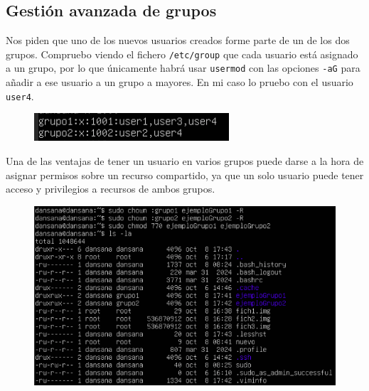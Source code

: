 \documentclass[10pt]{article}
\begin{document}
	\subsection{Gestión avanzada de grupos}
	Nos piden que uno de los nuevos usuarios creados forme parte de un de los dos grupos. Compruebo viendo el fichero \verb|/etc/group| que cada usuario está asignado a un grupo, por lo que únicamente habrá usar \verb|usermod| con las opciones \verb|-aG| para añadir a ese usuario a un grupo a mayores. En mi caso lo pruebo con el usuario \verb|user4|.
	\begin{figure}[H]
		\setlength{\abovecaptionskip}{0cm}
		\setlength{\belowcaptionskip}{0cm}
		\centering
		\includegraphics[width=0.6\linewidth]{Recursos/user2group.png}
	\end{figure}
	Una de las ventajas de tener un usuario en varios grupos puede darse a la hora de asignar permisos sobre un recurso compartido, ya que un solo usuario puede tener acceso y privilegios a recursos de ambos grupos.
	\begin{figure}[H]
		\setlength{\abovecaptionskip}{0cm}
		\setlength{\belowcaptionskip}{0cm}
		\centering
		\includegraphics[width=0.7\linewidth]{Recursos/ejemploGroup.png}
	\end{figure}
	
\end{document}
